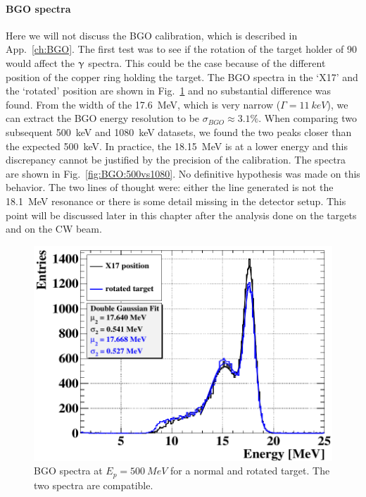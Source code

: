 \begin{refsection}
        \paragraph{BGO spectra}
        Here we will not discuss the BGO calibration, which is described in App.~\ref{ch:BGO}.
        The first test was to see if the rotation of the target holder of \SI{90}{\deg} would affect the $\upgamma$ spectra. 
        This could be the case because of the different position of the copper ring holding the target.
        The BGO spectra in the `X17' and the `rotated' position are shown in Fig.~\ref{fig:BGO:rotated} and no substantial difference was found.
        From the width of the \SI{17.6}{MeV}, which is very narrow ($\Gamma=\SI{11}{keV}$), we can extract the BGO energy resolution to be $\sigma_{BGO} \approx 3.1\%$.
        When comparing two subsequent \SI{500}{keV} and \SI{1080}{keV} datasets, we found the two peaks closer than the expected \SI{500}{keV}.
        In practice, the \SI{18.15}{MeV} is at a lower energy and this discrepancy cannot be justified by the precision of the calibration.
        The spectra are shown in Fig.~\ref{fig:BGO:500vs1080}.
        No definitive hypothesis was made on this behavior.
        The two lines of thought were: either the line generated is not the \SI{18.1}{MeV} resonance or there is some detail missing in the detector setup.
        This point will be discussed later in this chapter after the analysis done on the targets and on the CW beam.
        
        \begin{figure}
            \centering
            \includegraphics[width=0.9\linewidth]{Figures//X17//BGO/BGO_rotated.png}
            \caption{BGO spectra at $E_p=\SI{500}{MeV}$ for a normal and rotated target. The two spectra are compatible.}
            \label{fig:BGO:rotated}
        \end{figure}


\end{refsection}
